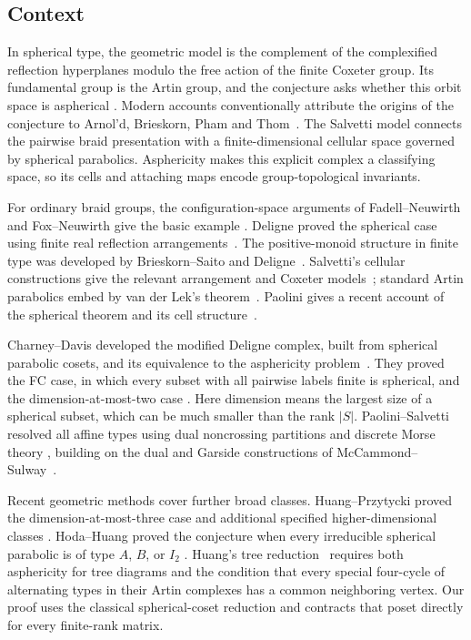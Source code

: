 \subsection{Context}

In spherical type, the geometric model is the complement of the
complexified reflection hyperplanes modulo the free action of the finite
Coxeter group.  Its fundamental group is the Artin group, and the
conjecture asks whether this orbit space is aspherical
\cite[Section~2]{Brieskorn1973}.  Modern accounts conventionally attribute
the origins of the conjecture to Arnol'd, Brieskorn, Pham and
Thom~\cite[Introduction]{Paolini2026}.
The Salvetti model connects the pairwise braid presentation with a
finite-dimensional cellular space governed by spherical parabolics.
Asphericity makes this explicit complex a classifying space, so its
cells and attaching maps encode group-topological invariants.

For ordinary braid groups, the configuration-space arguments of
Fadell--Neuwirth and Fox--Neuwirth give the basic example
\cite[Section~8]{FoxNeuwirth1962}.
Deligne proved the spherical case using finite real reflection
arrangements~\cite{Deligne1972}.  The positive-monoid structure in
finite type was developed by Brieskorn--Saito and
Deligne~\cite{BrieskornSaito1972,Deligne1972}.
Salvetti's cellular constructions give the relevant arrangement and
Coxeter models~\cite{Salvetti1987,Salvetti1994}; standard Artin
parabolics embed by van der Lek's
theorem~\cite{VanDerLek1983}.  Paolini gives a recent account of the
spherical theorem and its cell structure~\cite{Paolini2026}.

Charney--Davis developed the modified Deligne complex, built from
spherical parabolic cosets, and its equivalence to the asphericity
problem~\cite[Section~1.5 and Corollary~3.2.6]{CharneyDavis1995}.
They proved the FC case, in which every subset with all pairwise labels
finite is spherical, and the dimension-at-most-two case
\cite[Theorems~4.3.5--4.3.6 and Proposition~4.4.5]{CharneyDavis1995}.
Here dimension means the largest size of a spherical subset, which can
be much smaller than the rank $|S|$.
Paolini--Salvetti resolved all affine types using dual noncrossing
partitions and discrete Morse theory
\cite[Theorem~8.15]{PaoliniSalvetti2021}, building on the dual and
Garside constructions of McCammond--Sulway~\cite{McCammondSulway2017}.

Recent geometric methods cover further broad classes.
Huang--Przytycki proved the dimension-at-most-three case and additional
specified higher-dimensional classes
\cite[Theorems~1.1 and~12.20]{HuangPrzytycki2025}.
Hoda--Huang proved the conjecture when every irreducible spherical
parabolic is of type $A$, $B$, or $I_2$
\cite[Theorem~1.3]{HodaHuang2026}.
Huang's tree reduction~\cite[Theorem~1.1 and Corollary~9.2]{Huang2026}
requires both asphericity for tree diagrams and the condition that every
special four-cycle of alternating types in their Artin complexes has a
common neighboring vertex.  Our proof uses the classical spherical-coset reduction
and contracts that poset directly for every finite-rank matrix.

